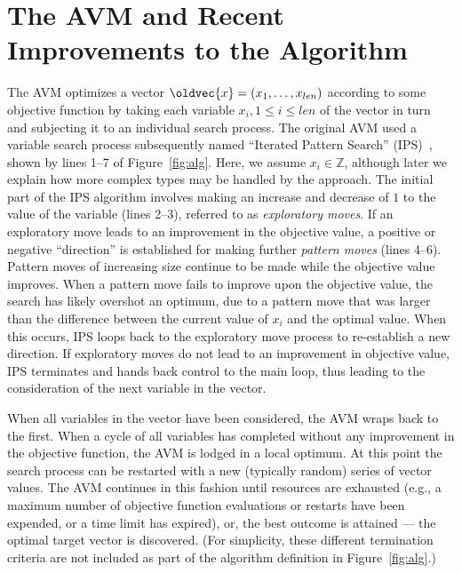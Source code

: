 \documentclass{llncs}
\let\vec\oldvec %
\newcommand{\inlineheading}[1]{\vspace{1mm} \noindent {\bf #1.}}
\begin{document}
\section{The AVM and Recent Improvements to the Algorithm}
\vspace{-1em}
\inlineheading{The Original AVM} The AVM optimizes a vector $\vec{x} = (x_1, \dots, x_{len})$ according to some objective function by taking each variable $x_i, 1 \leq i \leq len$ of the vector in turn and subjecting it to an individual search process. The original AVM used a variable search process subsequently named
``Iterated Pattern Search'' (IPS)~\cite{Kempka2013,Kempka2015}, shown by lines 1--7 of Figure~\ref{fig:alg}.
Here, we assume $x_i \in \mathbb{Z}$, although later we explain how more complex types may be handled by the approach.
The initial part of
the IPS algorithm involves making an increase and decrease of $1$ to the value of the variable (lines 2--3), referred to as
{\it exploratory moves}. If an exploratory move leads to an improvement in the objective value,
a positive or negative ``direction'' is established for making further {\it pattern moves\/} (lines 4--6). Pattern
moves of increasing size continue to be made while the objective value improves. When a pattern move fails to improve
upon the objective value, the search has likely overshot an optimum, due to a pattern move
that was larger than the difference between the current value of $x_i$ and the optimal value. When this occurs,
IPS loops back to the exploratory move process to re-establish a new direction. If exploratory moves do not lead to an
improvement in objective value, IPS terminates and hands back control to the main loop, thus leading to the consideration of the next variable in the vector.

When all variables in the vector have been considered, the AVM wraps back to the first. When a cycle of all variables has completed without any improvement in the objective function, the AVM is lodged in a local optimum. At this point the search process can be restarted with a new (typically random) series of vector values. The AVM continues in this fashion until resources are exhausted (e.g., a maximum number of objective function evaluations or restarts have been expended, or a time limit has expired), or, the best outcome is attained --- the optimal target vector is discovered. (For simplicity, these different termination criteria are not included as part of the algorithm definition in Figure~\ref{fig:alg}.)
\end{document}
